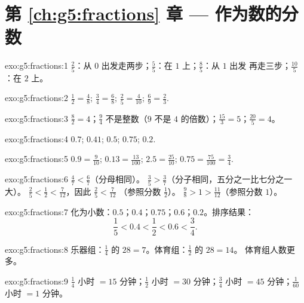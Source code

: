 \section*{第 \ref{ch:g5:fractions} 章 --- 作为数的分数}

\begin{solution}{exo:g5:fractions:1}
$\frac25$：从 $0$ 出发走两步；$\frac55$：在 $1$ 上；$\frac85$：从 $1$ 出发
再走三步；$\frac{10}{5}$：在 $2$ 上。
\end{solution}

\begin{solution}{exo:g5:fractions:2}
$\frac12 = \frac48$; \quad $\frac34 = \frac68$; \quad
$\frac25 = \frac{4}{10}$; \quad $\frac69 = \frac23$.
\end{solution}

\begin{solution}{exo:g5:fractions:3}
$\frac82 = 4$；\quad $\frac94$ 不是整数（$9$ 不是
$4$ 的倍数）；\quad $\frac{15}{3} = 5$；\quad $\frac{20}{5} = 4$。
\end{solution}

\begin{solution}{exo:g5:fractions:4}
$0.7$; \quad $0.41$; \quad $0.5$; \quad $0.75$; \quad $0.2$.
\end{solution}

\begin{solution}{exo:g5:fractions:5}
$0.9 = \frac{9}{10}$; \quad $0.13 = \frac{13}{100}$; \quad
$2.5 = \frac{25}{10}$; \quad $0.75 = \frac{75}{100} = \frac34$.
\end{solution}

\begin{solution}{exo:g5:fractions:6}
$\frac47 < \frac67$（分母相同）。\quad
$\frac35 > \frac37$（分子相同，五分之一比七分之一大）。\quad
$\frac25 < \frac12 < \frac{7}{12}$，因此 $\frac25 < \frac{7}{12}$
（参照分数 $\frac12$）。\quad
$\frac98 > 1 > \frac{11}{12}$（参照分数 $1$）。
\end{solution}

\begin{solution}{exo:g5:fractions:7}
化为小数：$0.5$；$0.4$；$0.75$；$0.6$；$0.2$。排序结果：
\[
\frac15 < 0.4 < \frac12 < 0.6 < \frac34 .
\]
\end{solution}

\begin{solution}{exo:g5:fractions:8}
乐器组：$\frac14$ 的 $28 = 7$。体育组：$\frac12$ 的 $28 = 14$。
体育组人数更多。
\end{solution}

\begin{solution}{exo:g5:fractions:9}
$\frac14$ 小时 $= 15$ 分钟；$\frac12$ 小时 $= 30$ 分钟；$\frac34$ 小时 $= 45$
分钟；$\frac{1}{60}$ 小时 $= 1$ 分钟。
\end{solution}

